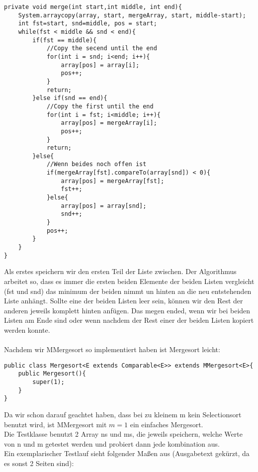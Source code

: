 \documentclass[11pt,a4paper,ngerman]{article}
\begin{document}
\begin{lstlisting}
private void merge(int start,int middle, int end){
	System.arraycopy(array, start, mergeArray, start, middle-start);
	int fst=start, snd=middle, pos = start;
	while(fst < middle && snd < end){
		if(fst == middle){
			//Copy the secend until the end
			for(int i = snd; i<end; i++){
				array[pos] = array[i];
				pos++;
			}
			return; 
		}else if(snd == end){
			//Copy the first until the end
			for(int i = fst; i<middle; i++){
				array[pos] = mergeArray[i];
				pos++;
			}	
			return; 
		}else{
			//Wenn beides noch offen ist
			if(mergeArray[fst].compareTo(array[snd]) < 0){
				array[pos] = mergeArray[fst];
				fst++;
			}else{
				array[pos] = array[snd];
				snd++;
			}
			pos++;
		}
	}
}
\end{lstlisting}
Als erstes speichern wir den ersten Teil der Liste zwischen. Der Algorithmus arbeitet so, dass es immer die ersten beiden Elemente der beiden Listen vergleicht (fst und snd) das minimum der beiden nimmt un hinten an die neu entstehenden Liste anhängt. Sollte eine der beiden Listen leer sein, können wir den Rest der anderen jeweils komplett hinten anfügen. Das megen ended, wenn wir bei beiden Listen am Ende sind oder wenn nachdem der Rest einer der beiden Listen kopiert werden konnte.\\
\vspace{\baselineskip}\\
Nachdem wir MMergesort so implementiert haben ist Mergesort leicht:
\begin{lstlisting}
public class Mergesort<E extends Comparable<E>> extends MMergesort<E>{	
	public Mergesort(){
		super(1);
	}
}
\end{lstlisting}

\pagebreak

Da wir schon darauf geachtet haben, dass bei zu kleinem m kein Selectionsort benutzt wird, ist MMergesort mit $m=1$ ein einfaches Mergesort.\\
Die Testklasse benutzt 2 Array ns und ms, die jeweils speichern, welche Werte von n und m getestet werden und probiert dann jede kombination aus.\\
Ein exemplarischer Testlauf sieht folgender Maßen aus (Ausgabetext gekürzt, da es sonst 2 Seiten sind):
\end{document}

